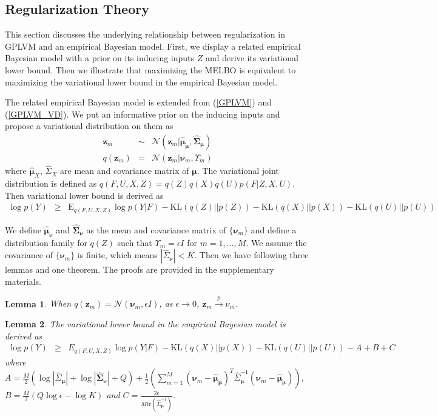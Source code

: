 \documentclass{article}
\newtheorem{lemma}{Lemma}
\begin{document}
\subsection{Regularization Theory} \label{sec:rt}
This section discusses the underlying relationship between regularization in GPLVM and an empirical Bayesian model. First, we display a related empirical Bayesian model with a prior on its inducing inputs $Z$ and derive its variational lower bound. Then we illustrate that maximizing the MELBO is equivalent to maximizing the variational lower bound in the empirical Bayesian model.

The related empirical Bayesian model is extended from (\ref{GPLVM}) and (\ref{GPLVM_VD}). We put an informative prior on the inducing inputs and propose a variational distribution on them as 
\begin{eqnarray}
\bm z_m & \sim & \mathcal{N}(\bm z_m| \hat{\bm \mu}_{\bm\mu}, \hat{\bm\Sigma}_{\bm\mu}) \nonumber \\
q(\bm z_m) & = & \mathcal{N}(\bm z_m|\bm \nu_m, \Upsilon_m) \nonumber
\end{eqnarray}
where $\hat{\bm \mu}_X$, $\hat{\Sigma}_X$ are mean and covariance matrix of $\bm \mu$. The variational joint distribution is defined as $q(F, U, X, Z) = q(Z)q(X)q(U)p(F|Z, X, U)$. Then variational lower bound is derived as
\begin{eqnarray}
\log p(Y) & \geq & \mathrm{E}_{q(F, U, X, Z)}\log p(Y|F) - \mathrm{KL}(q(Z)||p(Z)) - \mathrm{KL}(q(X)||p(X)) - \mathrm{KL}(q(U)||p(U)) \nonumber
\end{eqnarray}

We define $\hat{\bm \mu}_{\bm\nu}$ and $\hat{\bm\Sigma}_{\bm\nu}$ as the mean and covariance matrix of $\{\bm \nu_m\}$ and define a distribution family for $q(Z)$ such that $\Upsilon_{m} = \epsilon I$ for $m = 1,\ldots, M$. We assume the covariance of $\{\bm \nu_m\}$ is finite, which means $|\hat{\Sigma}_{\bm \nu}| < K$. Then we have following three lemmas and one theorem. The proofs are provided in the supplementary materials.

\begin{lemma}
	When $q(\bm z_m) = \mathcal{N}(\bm \nu_m, \epsilon I)$, as $\epsilon \rightarrow 0$, $\bm z_m \stackrel{p}{\rightarrow} \nu_m$.
\end{lemma}

\begin{lemma}
	The variational lower bound in the empirical Bayesian model is derived as 
	\begin{eqnarray}
	\log p(Y) & \geq & E_{q(F, U, X, Z)}\log p(Y|F) - \mathrm{KL}(q(X)||p(X)) - \mathrm{KL}(q(U)||p(U)) - A + B + C \nonumber
	\end{eqnarray}
	where $A = \frac{M}{2}(\log |\hat{\Sigma}_{\bm \mu}| + \log|\hat{\bm\Sigma}_{\bm\nu}| + Q) + \frac{1}{2}\left(\sum_{m = 1}^M(\bm\nu_m - \hat{\bm \mu}_{\bm \mu})^T\hat{\Sigma}_{\bm\mu}^{-1}(\bm\nu_m - \hat{\bm \mu}_{\bm \mu})\right)$, $B = \frac{M}{2}(Q\log\epsilon-\log K)$ and $C = \frac{2\epsilon}{M\mathrm{tr}(\hat{\Sigma}_{\bm\mu}^{-1})}$.
\end{lemma}
	
\end{document}
